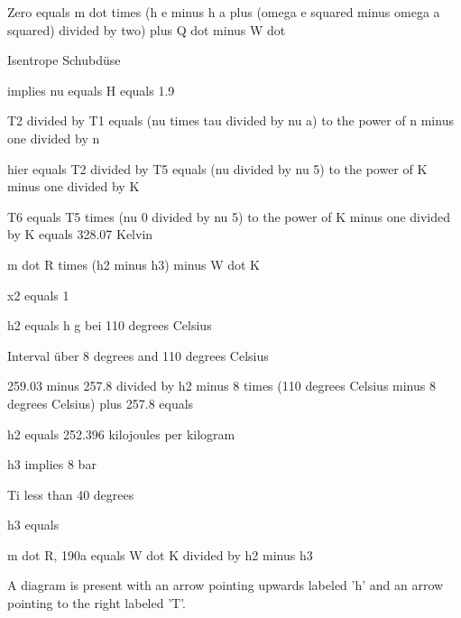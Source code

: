 Zero equals m dot times (h e minus h a plus (omega e squared minus omega a squared) divided by two) plus Q dot minus W dot

Isentrope Schubdüse

implies nu equals H equals 1.9

T2 divided by T1 equals (nu times tau divided by nu a) to the power of n minus one divided by n

hier equals T2 divided by T5 equals (nu divided by nu 5) to the power of K minus one divided by K

T6 equals T5 times (nu 0 divided by nu 5) to the power of K minus one divided by K equals 328.07 Kelvin

m dot R times (h2 minus h3) minus W dot K

x2 equals 1

h2 equals h g bei 110 degrees Celsius

Interval über 8 degrees and 110 degrees Celsius

259.03 minus 257.8 divided by h2 minus 8 times (110 degrees Celsius minus 8 degrees Celsius) plus 257.8 equals

h2 equals 252.396 kilojoules per kilogram

h3 implies 8 bar

Ti less than 40 degrees

h3 equals

m dot R, 190a equals W dot K divided by h2 minus h3

A diagram is present with an arrow pointing upwards labeled 'h' and an arrow pointing to the right labeled 'T'.